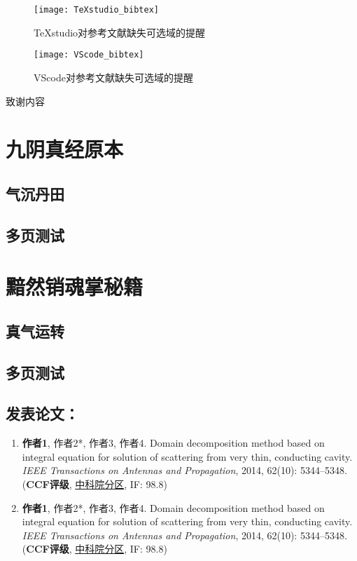 \documentclass[print, doctor, vlined]{DissertUESTC}
\begin{document}
	\begin{figure}[!h]
		\centering
		\texttt{[image: TeXstudio\_bibtex]}
		\caption{TeXstudio对参考文献缺失可选域的提醒} \label{fig: TeXstudio对参考文献缺失信息的提醒}
	\end{figure}
	\begin{figure}[!h]
		\centering
		\texttt{[image: VScode\_bibtex]}
		\caption{VScode对参考文献缺失可选域的提醒} \label{fig: VScode对参考文献缺失信息的提醒}
	\end{figure}
	
	\acknowledgement
	

	致谢内容

	
	
	
	
	\appendix
	
	\chapter{九阴真经原本}
	\section{气沉丹田}
	\newpage
	\section{多页测试}
	
	\chapter{黯然销魂掌秘籍}
	\section{真气运转}
	\newpage
	\section{多页测试}
	
	\achievement %
	
	\section*{发表论文：}
	
	\begin{enumerate}
	    \item \textbf{作者1}, 作者2*, 作者3, 作者4. Domain decomposition method based on integral equation for solution of scattering from very thin, conducting cavity. \emph{IEEE Transactions on Antennas and Propagation}, 2014, 62(10): 5344--5348. (\textbf{CCF评级}, \underline{中科院分区}, IF: 98.8)
	    
		\setcounter{enumi}{98}
	    
		\item \textbf{作者1}, 作者2*, 作者3, 作者4. Domain decomposition method based on integral equation for solution of scattering from very thin, conducting cavity. \emph{IEEE Transactions on Antennas and Propagation}, 2014, 62(10): 5344--5348. (\textbf{CCF评级}, \underline{中科院分区}, IF: 98.8)
	\end{enumerate}
	
\end{document}
